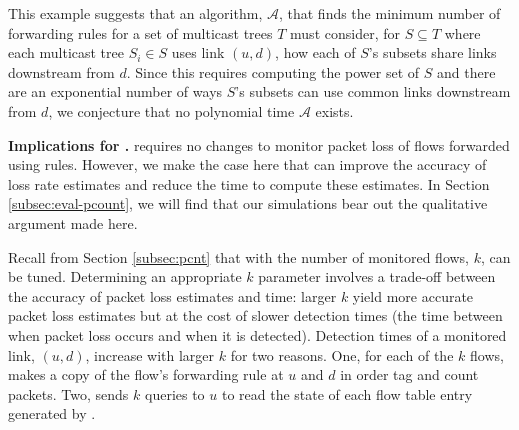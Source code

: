 This example suggests that an algorithm, $\mathcal{A}$, that finds the minimum number of forwarding rules for a set of multicast trees $T$ 
must consider, for $S \subseteq T$ where each multicast tree $S_i \in S$ uses link $(u,d)$, how each of $S$'s subsets share links downstream from $d$.
Since this requires computing the power set of $S$ and there are an exponential number of ways $S$'s subsets can use common links downstream from $d$,
we conjecture that no polynomial time $\mathcal{A}$ exists. %







{\bf Implications for \pcnts.}
\pcnt requires no changes to monitor packet loss of flows forwarded using \merge rules. However, we make 
the case here that \merge can improve the accuracy of \pcnt loss rate estimates and reduce the time to compute these estimates.  In Section
\ref{subsec:eval-pcount}, we will find that our simulations bear out the qualitative argument made here.

Recall from Section \ref{subsec:pcnt} that with \pcnt the number of monitored flows, $k$, can be tuned.
Determining an appropriate $k$ parameter involves a trade-off between the accuracy of packet loss estimates and time: larger $k$ yield more accurate packet loss estimates
but at the cost of slower detection times (the time between when packet loss occurs and when it is detected). Detection times of a monitored link, $(u,d)$, increase with larger $k$
for two reasons. One, for each of the $k$ flows, \pcnt makes a copy of the flow's forwarding rule at $u$ and $d$ in order tag and count packets.  Two, 
\pcnt sends $k$ queries to $u$ to read the state of each flow table entry generated by \pcnts. %

